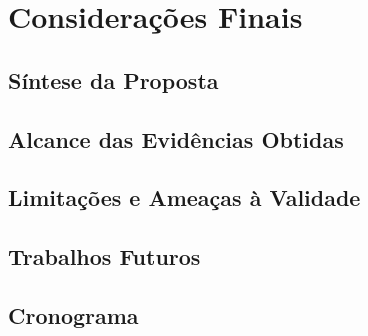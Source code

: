 \chapter{Considerações Finais}

\section{Síntese da Proposta}

\section{Alcance das Evidências Obtidas}

\section{Limitações e Ameaças à Validade}

\section{Trabalhos Futuros}

\section{Cronograma}
